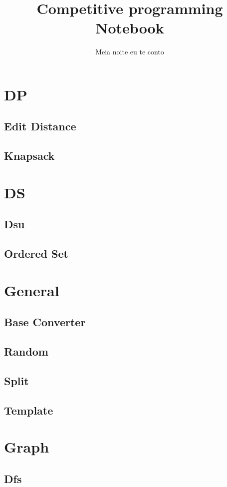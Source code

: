 \documentclass{article}
\title{Competitive programming Notebook \emoji{balloon} }
\author{Meia noite eu te conto}
\date{}
\newcommand\includes[2]{ 
   \subsection{#1}
   
}
\begin{document}
\maketitle
\thispagestyle{fancy}
\begin{multicols}{2}

\tableofcontents

\newpage

\section{DP}
\includes{Edit Distance}{code/dp/edit_distance.cpp}
\includes{Knapsack}{code/dp/knapsack.cpp}
\section{DS}
\includes{Dsu}{code/ds/dsu.cpp}
\includes{Ordered Set}{code/ds/ordered_set.cpp}
\section{General}
\includes{Base Converter}{code/general/base_converter.cpp}
\includes{Random}{code/general/random.cpp}
\includes{Split}{code/general/split.cpp}
\includes{Template}{code/general/template.cpp}
\section{Graph}
\includes{Dfs}{code/graph/dfs.cpp}

\end{multicols}
\end{document}
